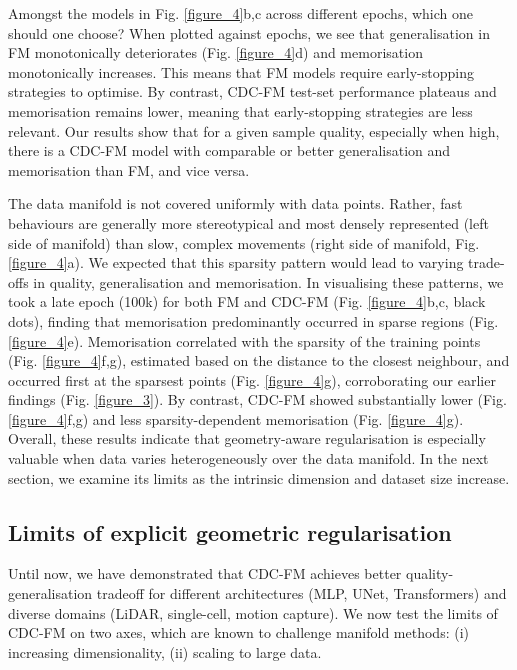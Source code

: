 \documentclass{article} %
\begin{document}
Amongst the models in Fig. \ref{figure_4}b,c across different epochs, which one should one choose?
When plotted against epochs, we see that generalisation in FM monotonically deteriorates (Fig. \ref{figure_4}d) and memorisation monotonically increases.
This means that FM models require early-stopping strategies to optimise. 
By contrast, CDC-FM test-set performance plateaus and memorisation remains lower, meaning that early-stopping strategies are less relevant.
Our results show that for a given sample quality, especially when high, there is a CDC-FM model with comparable or better generalisation and memorisation than FM, and vice versa.

The data manifold is not covered uniformly with data points. Rather, fast behaviours are generally more stereotypical and most densely represented (left side of manifold) than slow, complex movements (right side of manifold, Fig. \ref{figure_4}a).
We expected that this sparsity pattern would lead to varying trade-offs in quality, generalisation and memorisation.
In visualising these patterns, we took a late epoch (100k) for both FM and CDC-FM (Fig. \ref{figure_4}b,c, black dots), finding that memorisation predominantly occurred in sparse regions (Fig. \ref{figure_4}e).
Memorisation correlated with the sparsity of the training points (Fig. \ref{figure_4}f,g), estimated based on the distance to the closest neighbour, and occurred first at the sparsest points (Fig. \ref{figure_4}g), corroborating our earlier findings (Fig. \ref{figure_3}). 
By contrast, CDC-FM showed substantially lower (Fig. \ref{figure_4}f,g) and less sparsity-dependent memorisation (Fig. \ref{figure_4}g). 
Overall, these results indicate that geometry-aware regularisation is especially valuable when data varies heterogeneously over the data manifold. In the next section, we examine its limits as the intrinsic dimension and dataset size increase.


\subsection{Limits of explicit geometric regularisation}

Until now, we have demonstrated that CDC-FM achieves better quality-generalisation tradeoff for different architectures (MLP, UNet, Transformers) and diverse domains (LiDAR, single-cell, motion capture). We now test the limits of CDC-FM on two axes, which are known to challenge manifold methods: (i) increasing dimensionality, (ii) scaling to large data. 
\end{document}
